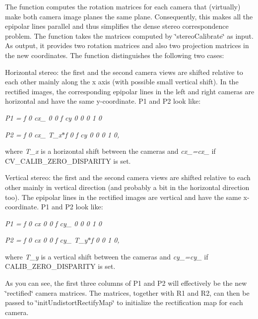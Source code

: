 The function computes the rotation matrices for each camera that (virtually) make both camera image planes the same plane. Consequently, this makes all the epipolar lines parallel and thus simplifies the dense stereo correspondence problem. The function takes the matrices computed by \char`\"{}stereo\+Calibrate\char`\"{} as input. As output, it provides two rotation matrices and also two projection matrices in the new coordinates. The function distinguishes the following two cases\+:


\begin{DoxyItemize}
\item Horizontal stereo\+: the first and the second camera views are shifted relative to each other mainly along the x axis (with possible small vertical shift). In the rectified images, the corresponding epipolar lines in the left and right cameras are horizontal and have the same y-\/coordinate. P1 and P2 look like\+: 
\end{DoxyItemize}

{\itshape P1 = f 0 cx\+\_ 0 0 f cy 0 0 0 1 0 }

{\itshape P2 = f 0 cx\+\_ T\+\_\+x$\ast$f 0 f cy 0 0 0 1 0,}

where {\itshape T\+\_\+x} is a horizontal shift between the cameras and {\itshape cx\+\_=cx\+\_} if {\ttfamily C\+V\+\_\+\+C\+A\+L\+I\+B\+\_\+\+Z\+E\+R\+O\+\_\+\+D\+I\+S\+P\+A\+R\+I\+TY} is set.


\begin{DoxyItemize}
\item Vertical stereo\+: the first and the second camera views are shifted relative to each other mainly in vertical direction (and probably a bit in the horizontal direction too). The epipolar lines in the rectified images are vertical and have the same x-\/coordinate. P1 and P2 look like\+: 
\end{DoxyItemize}

{\itshape P1 = f 0 cx 0 0 f cy\+\_ 0 0 0 1 0 }

{\itshape P2 = f 0 cx 0 0 f cy\+\_ T\+\_\+y$\ast$f 0 0 1 0,}

where {\itshape T\+\_\+y} is a vertical shift between the cameras and {\itshape cy\+\_=cy\+\_} if {\ttfamily C\+A\+L\+I\+B\+\_\+\+Z\+E\+R\+O\+\_\+\+D\+I\+S\+P\+A\+R\+I\+TY} is set.

As you can see, the first three columns of {\ttfamily P1} and {\ttfamily P2} will effectively be the new \char`\"{}rectified\char`\"{} camera matrices. The matrices, together with {\ttfamily R1} and {\ttfamily R2}, can then be passed to \char`\"{}init\+Undistort\+Rectify\+Map\char`\"{} to initialize the rectification map for each camera.

